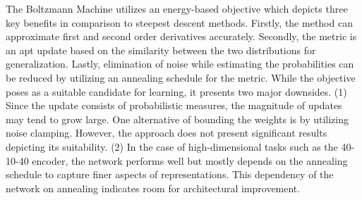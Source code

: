 \documentclass[11pt,letterpaper]{article}
\begin{document}
The Boltzmann Machine utilizes an energy-based objective which depicts three key benefits in comparison to steepest descent methods. Firstly, the method can approximate first and second order derivatives accurately. Secondly, the metric is an apt update based on the similarity between the two distributions for generalization. Lastly, elimination of noise while estimating the probabilities can be reduced by utilizing an annealing schedule for the metric. While the objective poses as a suitable candidate for learning, it presents two major downsides. (1) Since the update consists of probabilistic measures, the magnitude of updates may tend to grow large. One alternative of bounding the weights is by utilizing noise clamping. However, the approach does not present significant results depicting its suitability. (2) In the case of high-dimensional tasks such as the 40-10-40 encoder, the network performs well but mostly depends on the annealing schedule to capture finer aspects of representations. This dependency of the network on annealing indicates room for architectural improvement.  
\end{document}
